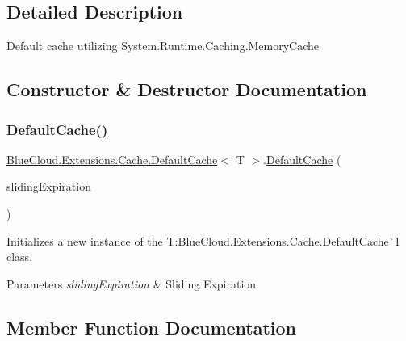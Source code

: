 \subsection{Detailed Description}
Default cache utilizing System.\+Runtime.\+Caching.\+Memory\+Cache 



\subsection{Constructor \& Destructor Documentation}
\mbox{\label{class_blue_cloud_1_1_extensions_1_1_cache_1_1_default_cache_a14fec20f91a78d445887fab2f59cfc7c}} 
\subsubsection{\texorpdfstring{Default\+Cache()}{DefaultCache()}}
{\footnotesize\ttfamily \mbox{\hyperlink{class_blue_cloud_1_1_extensions_1_1_cache_1_1_default_cache}{Blue\+Cloud.\+Extensions.\+Cache.\+Default\+Cache}}$<$ T $>$.\mbox{\hyperlink{class_blue_cloud_1_1_extensions_1_1_cache_1_1_default_cache}{Default\+Cache}} (\begin{DoxyParamCaption}\item[{Time\+Span}]{sliding\+Expiration }\end{DoxyParamCaption})\hspace{0.3cm}{\ttfamily [inline]}}



Initializes a new instance of the T\+:\+Blue\+Cloud.\+Extensions.\+Cache.\+Default\+Cache\`{}1 class. 


\begin{DoxyParams}{Parameters}
{\em sliding\+Expiration} & Sliding Expiration\\
\hline
\end{DoxyParams}


\subsection{Member Function Documentation}
\mbox{\label{class_blue_cloud_1_1_extensions_1_1_cache_1_1_default_cache_a4ce78dfa582354a24038b9e94bdd750f}} 
